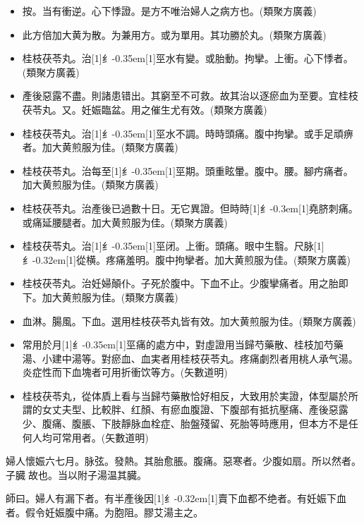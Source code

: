 \documentclass[11pt,oneside,b5paper]{ctexbook}
\begin{document}
\begin{flushleft}
\begin{itemize}
\item 按。当有衝逆。心下悸證。是方不唯治婦人之病方也。(類聚方廣義)
\item 此方倍加大黄为散。为兼用方。或为單用。其功勝於丸。(類聚方廣義)
\item 桂枝茯苓丸。治{\hbox{\scalebox{0.68}[1]{纟}\kern-0.35em\scalebox{0.64}[1]{巠}}}水有變。或胎動。拘攣。上衝。心下悸者。(類聚方廣義)
\item 產後惡露不盡。則諸患错出。其窮至不可救。故其治以逐瘀血为至要。宜桂枝茯苓丸。又。妊娠臨盆。用之催生尤有效。(類聚方廣義)
\item 桂枝茯苓丸。治{\hbox{\scalebox{0.68}[1]{纟}\kern-0.35em\scalebox{0.64}[1]{巠}}}水不調。時時頭痛。腹中拘攣。或手足頑痹者。加大黄煎服为佳。(類聚方廣義)
\item 桂枝茯苓丸。治每至{\hbox{\scalebox{0.68}[1]{纟}\kern-0.35em\scalebox{0.64}[1]{巠}}}期。頭重眩暈。腹中。腰。腳㽲痛者。加大黄煎服为佳。(類聚方廣義)
\item 桂枝茯苓丸。治產後已過數十日。无它異證。但時時{\hbox{\scalebox{0.6}[1]{纟}\kern-0.3em\scalebox{0.63}[1]{堯}}}脐刺痛。或痛延腰腿者。加大黄煎服为佳。(類聚方廣義)
\item 桂枝茯苓丸。治{\hbox{\scalebox{0.68}[1]{纟}\kern-0.35em\scalebox{0.64}[1]{巠}}}闭。上衝。頭痛。眼中生翳。尺脉{\hbox{\scalebox{0.6}[1]{纟}\kern-0.32em\scalebox{0.7}[1]{從}}}横。疼痛羞明。腹中拘攣者。加大黄煎服为佳。(類聚方廣義)
\item 桂枝茯苓丸。治妊婦顛仆。子死於腹中。下血不止。少腹攣痛者。用之胎即下。加大黄煎服为佳。(類聚方廣義)
\item 血淋。腸風。下血。選用桂枝茯苓丸皆有效。加大黄煎服为佳。(類聚方廣義)
\item 常用於月{\hbox{\scalebox{0.68}[1]{纟}\kern-0.35em\scalebox{0.64}[1]{巠}}}痛的處方中，對虛證用当歸芍藥散、桂枝加芍藥湯、小建中湯等。對瘀血、血実者用桂枝茯苓丸。疼痛劇烈者用桃人承气湯。炎症性而下血塊者可用折衝饮等方。(矢數道明)
\item 桂枝茯苓丸，從体貭上看与当歸芍藥散恰好相反，大致用於実證，体型屬於所謂的女丈夫型、比較胖、红顏、有瘀血腹證、下腹部有抵抗壓痛、產後惡露少、腹痛、腹脹、下肢靜脉血栓症、胎盤殘留、死胎等時應用，但本方不是任何人均可常用者。(矢數道明)
\end{itemize}

婦人懷娠六七月。脉弦。發熱。其胎愈脹。腹痛。惡寒者。少腹如扇。所以然者。子臓{𫔭}故也。当以附子湯温其臓。

師曰。婦人有漏下者。有半產後因{\hbox{\scalebox{0.6}[1]{纟}\kern-0.32em\scalebox{0.7}[1]{賣}}}下血都不绝者。有妊娠下血者。假令妊娠腹中痛。为胞阻。膠艾湯主之。


\end{flushleft}
\end{document}
